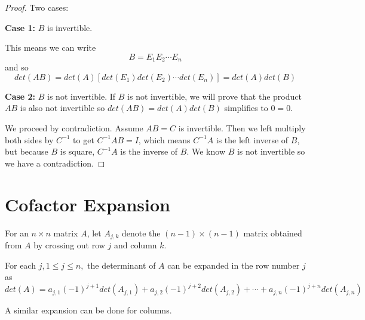 \begin{proof}
Two cases: 

\textbf{Case 1: } $B$ is invertible. 

This means we can write 
$$B = E_{1} E_{2} \cdots E_{n}$$
and so 
$$det(AB) = det(A)[det(E_{1}) det(E_{2}) \cdots det(E_{n})] = det(A) det(B)$$

\textbf{Case 2: } $B$ is not invertible. 
If $B$ is not invertible, we will prove that the product $AB$ is also not invertible so $det(AB) = det(A) det(B)$ simplifies to $0 = 0$. 

We proceed by contradiction. Assume $AB = C$ is invertible. Then we left multiply both sides by $C^{-1}$ to get $C^{-1} AB = I$, which means $C^{-1}A$ is the left inverse of $B$, but because $B$ is square, $C^{-1}A$ is the inverse of $B$. We know $B$ is not invertible so we have a contradiction. 
\end{proof}

\section{Cofactor Expansion}

For an $n \times n$ matrix $A$, let $A_{j, k}$ denote the $(n - 1) \times (n - 1)$ matrix obtained from $A$ by crossing out row $j$ and column $k$. 

\begin{theorem}
For each $j, 1 \leq j \leq n,$ the determinant of $A$ can be expanded in the row number $j$ as 
$$det(A) = a_{j, 1} (-1)^{j+1} det(A_{j, 1}) + a_{j, 2} (-1)^{j+2} det(A_{j, 2}) + \cdots + a_{j, n} (-1)^{j + n} det(A_{j, n})$$

A similar expansion can be done for columns. 
\end{theorem}

